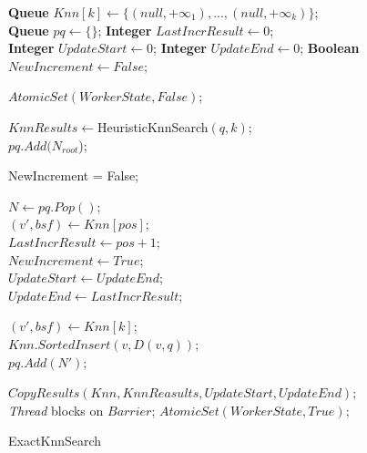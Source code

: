 \small
\begin{algorithm}
	\DontPrintSemicolon
	\vspace{.2cm}
	
	\textbf{Queue} $Knn[k] \gets \{(null, +\infty_{1}), ..., (null, +\infty_{k})\}$;\\
	\textbf{Queue} $pq  \gets \{\}$; 
	\textbf{Integer} $LastIncrResult \gets 0$; \\
	\textbf{Integer} $UpdateStart \gets 0$; 
	\textbf{Integer} $UpdateEnd \gets 0$; 
	\textbf{Boolean} $NewIncrement \gets False$;
	\vspace{.2cm}
	
	$AtomicSet(WorkerState, False)$;\\ 
	
	$KnnResults \gets ${\sc HeuristicKnnSearch$(q, k)$};\\

	$pq.Add(N_{root}$);\\
	\vspace{.2cm}
	
	{
		NewIncrement = False;\\
		{
			$N \gets pq.Pop()$;\\
			
			{
				$(v', bsf) \gets Knn[pos]$;\\
				{
					$LastIncrResult \gets pos + 1$;\\
					$NewIncrement \gets True$;\\
				}
			}
			{
				$UpdateStart \gets UpdateEnd$;\\
				$UpdateEnd \gets LastIncrResult$;\\ 
			}
		
			{
				$(v', bsf) \gets Knn[k]$;\\
				{
					{
						$Knn.SortedInsert(v, D(v, q))$;\\
					}
				}
			}
			\Else
			{
				{
					{
						$pq.Add(N')$;\\	
					}	
				}
			}
		}
	
		$CopyResults(Knn, KnnReasults, UpdateStart, UpdateEnd)$;\\
		 {\it Thread} blocks on $Barrier$;
		 $AtomicSet(WorkerState, True)$;\\ 
	}
	\caption{{\sc ExactKnnSearch}}
	\label{algo:exact_knn_search}
\end{algorithm}

